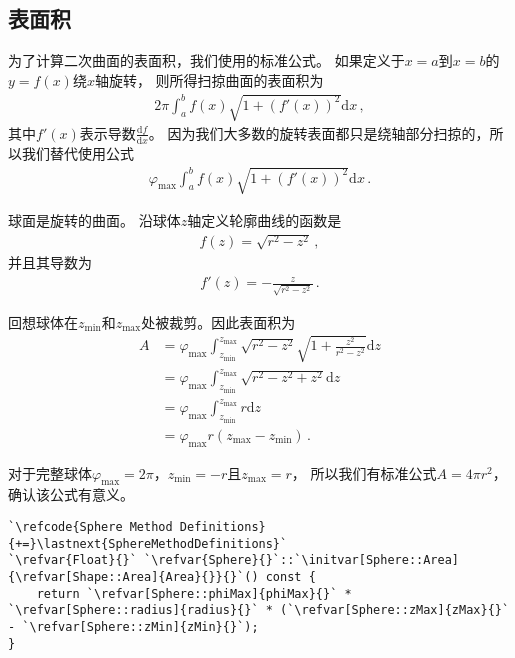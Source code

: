 \subsection{表面积}\label{sub:表面积2}
为了计算二次曲面的表面积，我们使用的标准公式。
如果定义于$x=a$到$x=b$的$y=f(x)$绕$x$轴旋转，
则所得扫掠曲面的表面积为
\begin{align*}
    2\pi\int_a^b{f(x)\sqrt{1+(f'(x))^2}\mathrm{d}x}\, ,
\end{align*}
其中$f'(x)$表示导数$\displaystyle\frac{\mathrm{d}f}{\mathrm{d}x}$。
因为我们大多数的旋转表面都只是绕轴部分扫掠的，所以我们替代使用公式
\begin{align*}
    \varphi_{\max}\int_a^b{f(x)\sqrt{1+(f'(x))^2}\mathrm{d}x}\, .
\end{align*}

球面是旋转的曲面。
沿球体$z$轴定义轮廓曲线的函数是
\begin{align*}
    f(z)=\sqrt{r^2-z^2}\, ,
\end{align*}
并且其导数为
\begin{align*}
    f'(z)=-\frac{z}{\sqrt{r^2-z^2}}\, .
\end{align*}

回想球体在$z_{\min}$和$z_{\max}$处被裁剪。因此表面积为
\begin{align*}
    A & =\varphi_{\max}\int_{z_{\min}}^{z_{\max}}{\sqrt{r^2-z^2}\sqrt{1+\frac{z^2}{r^2-z^2}}\mathrm{d}z} \\
      & =\varphi_{\max}\int_{z_{\min}}^{z_{\max}}{\sqrt{r^2-z^2+z^2}\mathrm{d}z}                         \\
      & =\varphi_{\max}\int_{z_{\min}}^{z_{\max}}{r\mathrm{d}z}                                          \\
      & =\varphi_{\max}r(z_{\max}-z_{\min})\, .
\end{align*}

对于完整球体$\varphi_{\max}=2\pi$，$z_{\min}=-r$且$z_{\max}=r$，
所以我们有标准公式$A=4\pi r^2$，确认该公式有意义。
\begin{lstlisting}
`\refcode{Sphere Method Definitions}{+=}\lastnext{SphereMethodDefinitions}`
`\refvar{Float}{}` `\refvar{Sphere}{}`::`\initvar[Sphere::Area]{\refvar[Shape::Area]{Area}{}}{}`() const {
    return `\refvar[Sphere::phiMax]{phiMax}{}` * `\refvar[Sphere::radius]{radius}{}` * (`\refvar[Sphere::zMax]{zMax}{}` - `\refvar[Sphere::zMin]{zMin}{}`);
}
\end{lstlisting}